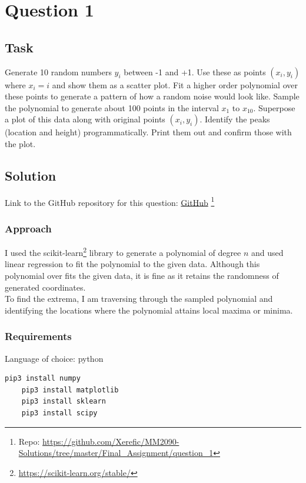 \section{Question 1}

\subsection{Task}
Generate 10 random numbers $y_i$ between -1 and +1. Use these as points $\left(x_i,y_i\right)$ where $x_i=i$ and show them as a scatter plot. Fit a higher order polynomial over these points to generate a pattern of how a random noise would look like. Sample the polynomial to generate about 100 points in the interval $x_1$ to $x_{10}$. Superpose a plot of this data along with original points $\left(x_i,y_i\right)$.  Identify the peaks (location and height) programmatically. Print them out and confirm those with the plot.

\subsection{Solution}

Link to the GitHub repository for this question: \href{https://github.com/Xerefic/MM2090-Solutions/tree/master/Final_Assignment/question_1}{GitHub} \footnote{Repo: \url{https://github.com/Xerefic/MM2090-Solutions/tree/master/Final_Assignment/question_1}}

\subsubsection{Approach}
I used the scikit-learn\footnote{\url{https://scikit-learn.org/stable/}} library to generate a polynomial of degree $n$ and used linear regression to fit the polynomial to the given data. Although this polynomial over fits the given data, it is fine as it retains the randomness of generated coordinates. \\
To find the extrema, I am traversing through the sampled polynomial and identifying the locations where the polynomial attains local maxima or minima. 

\subsubsection{Requirements}
Language of choice: python
\begin{lstlisting}[language=bash]
	pip3 install numpy
	pip3 install matplotlib
	pip3 install sklearn
	pip3 install scipy
\end{lstlisting}


